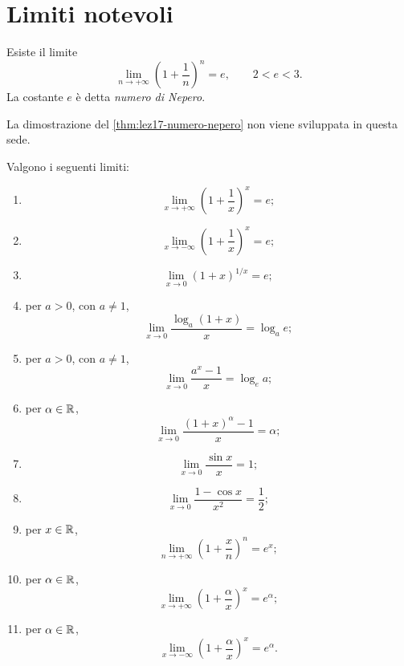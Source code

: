 \clearpage

\section{Limiti notevoli}
\label{sec:lez17-limiti-notevoli}

\begin{theorem}
\label{thm:lez17-numero-nepero}
Esiste il limite
\[
  \lim_{n\to+\infty}\left(1+\frac1n\right)^n=e,
  \qquad 2<e<3.
\]
La costante \(e\) è detta \emph{numero di Nepero}.
\end{theorem}

La dimostrazione del \cref{thm:lez17-numero-nepero}
non viene sviluppata in questa sede.

\begin{theorem}
\label{thm:lez17-limiti-notevoli}
Valgono i seguenti limiti:
\begin{enumerate}
  \item
  \[
    \lim_{x\to+\infty}\left(1+\frac1x\right)^x=e;
  \]
  \item
  \[
    \lim_{x\to-\infty}\left(1+\frac1x\right)^x=e;
  \]
  \item
  \[
    \lim_{x\to0}(1+x)^{1/x}=e;
  \]
  \item per \(a>0\), con \(a\ne1\),
  \[
    \lim_{x\to0}\frac{\log_a(1+x)}{x}=\log_a e;
  \]
  \item per \(a>0\), con \(a\ne1\),
  \[
    \lim_{x\to0}\frac{a^x-1}{x}=\log_e a;
  \]
  \item per \(\alpha\in\mathbb{R}\),
  \[
    \lim_{x\to0}\frac{(1+x)^\alpha-1}{x}=\alpha;
  \]
  \item
  \[
    \lim_{x\to0}\frac{\sin x}{x}=1;
  \]
  \item
  \[
    \lim_{x\to0}\frac{1-\cos x}{x^2}=\frac12;
  \]
  \item per \(x\in\mathbb{R}\),
  \[
    \lim_{n\to+\infty}\left(1+\frac{x}{n}\right)^n=e^x;
  \]
  \item per \(\alpha\in\mathbb{R}\),
  \[
    \lim_{x\to+\infty}\left(1+\frac\alpha x\right)^x=e^\alpha;
  \]
  \item per \(\alpha\in\mathbb{R}\),
  \[
    \lim_{x\to-\infty}\left(1+\frac\alpha x\right)^x=e^\alpha.
  \]
\end{enumerate}
\end{theorem}

\clearpage

